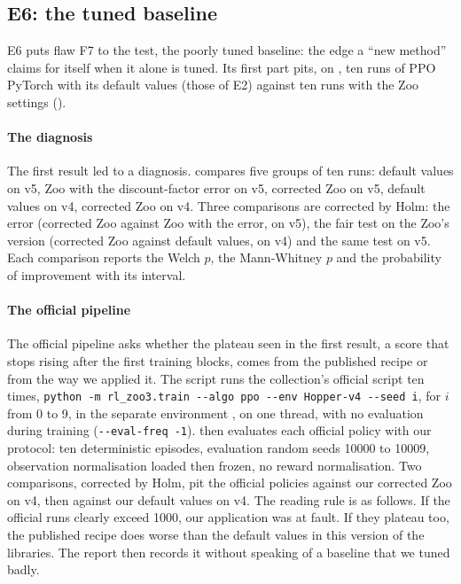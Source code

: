 \subsection{E6: the tuned baseline}\label{sec:plan-e6}
E6 puts flaw F7 to the test, the poorly tuned baseline: the edge a \enquote{new method} claims for
itself when it alone is tuned. Its first part pits, on , ten runs of PPO PyTorch with its
default values (those of E2) against ten runs with the Zoo settings ().

\paragraph{The diagnosis}
The first result led to a diagnosis.  compares five
groups of ten runs: default values on v5, Zoo with the discount-factor error on v5, corrected Zoo on v5,
default values on v4, corrected Zoo on v4. Three comparisons are corrected by Holm: the error (corrected Zoo
against Zoo with the error, on v5), the fair test on the Zoo's version (corrected Zoo against default values,
on v4) and the same test on v5. Each comparison reports the Welch $p$, the Mann-Whitney $p$ and the probability
of improvement with its interval.

\paragraph{The official pipeline}
The official pipeline asks whether the plateau seen in
the first result, a score that stops rising after the first training blocks, comes from the published recipe
or from the way we applied it. The script  runs the collection's official script
ten times, \texttt{python -m rl\_zoo3.train -{}-algo ppo -{}-env Hopper-v4 -{}-seed i}, for $i$ from 0 to 9,
in the separate environment , on one thread, with no evaluation during training
(\texttt{-{}-eval-freq -1}).  then evaluates each official policy with our protocol: ten
deterministic episodes, evaluation random seeds \num{10000} to \num{10009}, observation normalisation loaded
then frozen, no reward normalisation. Two comparisons, corrected by Holm, pit the official
policies against our corrected Zoo on v4, then against our default values on v4. The reading rule is as
follows. If the official runs clearly exceed \num{1000}, our application was at fault. If they plateau too, the
published recipe does worse than the default values in this version of the libraries. The report then records it
without speaking of a baseline that we tuned badly.

